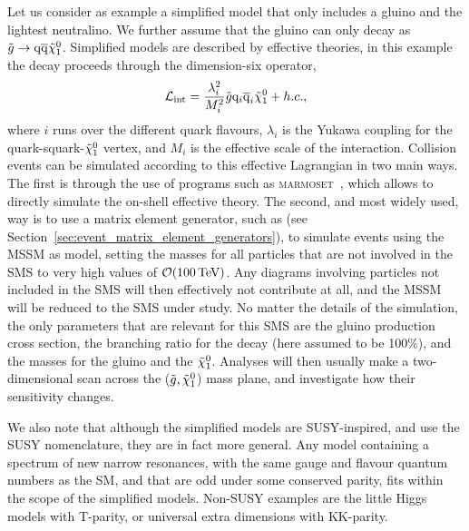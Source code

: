 Let us consider as example a simplified model that only includes a gluino and the lightest
neutralino. We further assume that the gluino can only decay as $\tilde{g}\rightarrow \mathrm{q} \overline{\mathrm{q}}
\tilde{\chi}_1^0$. Simplified models are described by effective theories, in this example the decay
proceeds through the dimension-six operator, 
\begin{equation}
  \mathcal{L}_{\text{int}} = \frac{\lambda_i^2}{M_i^2} \tilde{g} \mathrm{q}_i \overline{\mathrm{q}}_i \tilde{\chi}_1^0 + h.c. , 
\end{equation}
where $i$ runs over the different quark flavours, $\lambda_i$ is the Yukawa coupling for the
quark-squark-$\tilde{\chi}_1^0$ vertex, and $M_i$ is the effective scale of the interaction. 
Collision events can be simulated according to this effective Lagrangian in two main ways. The
first is through the use of programs such as \textsc{marmoset}~\cite{ArkaniHamed:2007fw}, which
allows to directly simulate the on-shell effective theory. 
The second, and most widely used, way is to use a matrix element generator, such as \MADGRAPH (see
Section~\ref{sec:event_matrix_element_generators}), to simulate events using the MSSM as model,
setting the masses for all particles that are not involved in the SMS to very high values of
$\mathcal{O}(100\,\text{Te\hspace{-.08em}V})$.
Any diagrams involving particles not included in the SMS will then effectively not contribute at
all, and the MSSM will be reduced to the SMS under study.  
No matter the details of the simulation, the only parameters that are relevant for this SMS are the
gluino production cross
section, the branching ratio for the decay (here assumed to be 100\%), and the masses for the gluino
and the $\tilde{\chi}_1^0$. Analyses will then usually make a two-dimensional scan across the
($\tilde{g},\tilde{\chi}_1^0$) mass plane, and investigate how their sensitivity changes.


We also note that although the simplified models are SUSY-inspired, and use the SUSY nomenclature,
they are in fact more general. Any model containing a spectrum of new narrow resonances, with the
same gauge and flavour quantum numbers as the SM, and that are odd under some conserved parity, fits
within the scope of the simplified models. Non-SUSY examples are the little Higgs models with
T-parity, or universal extra dimensions with KK-parity. 



 